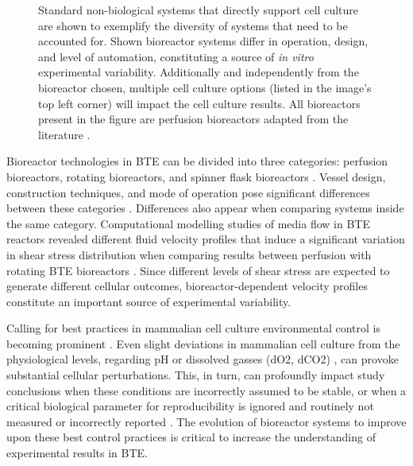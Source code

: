 \begin{figure}
\caption{Standard non-biological systems that directly support cell culture are shown to exemplify the diversity of systems that need to be accounted for. Shown bioreactor systems differ in operation, design, and level of automation, constituting a source of \textit{in vitro} experimental variability. Additionally and independently from the bioreactor chosen, multiple cell culture options (listed in the image's top left corner) will impact the cell culture results. All bioreactors present in the figure are perfusion bioreactors adapted from the literature \cite{Lim2019-gx, Birru2018-rj, Gabetti2022-hp}.}
\label{fig1d2}
\end{figure}

Bioreactor technologies in \ac{BTE} can be divided into three categories: perfusion bioreactors, rotating bioreactors, and spinner flask bioreactors \cite{Kazimierczak2022-mq}. Vessel design, construction techniques, and mode of operation pose significant differences between these categories \cite{Melo-Fonseca2023-fd}. Differences also appear when comparing systems inside the same category. Computational modelling studies of media flow in \ac{BTE} reactors revealed different fluid velocity profiles that induce a significant variation in shear stress distribution when comparing results between perfusion with rotating \ac{BTE} bioreactors \cite{Nokhbatolfoghahaei2020-yt}. Since different levels of shear stress are expected to generate different cellular outcomes, bioreactor-dependent velocity profiles constitute an important source of experimental variability. 

Calling for best practices in mammalian cell culture environmental control is becoming prominent \cite{Klein2021-dz, Klein2022-yj}.  Even slight deviations in mammalian cell culture from the physiological levels, regarding \acs{pH} \cite{Michl2019-js} or dissolved gasses (\acs{dO2}, \acs{dCO2}) \cite{Ast2019-mc, Place2017-bn}, can provoke substantial cellular perturbations. This, in turn, can profoundly impact study conclusions when these conditions are incorrectly assumed to be stable, or when a critical biological parameter for reproducibility is ignored and routinely not measured or incorrectly reported \cite{Al-Ani2018-df}. The evolution of bioreactor systems to improve upon these best control practices is critical to increase the understanding of experimental results in \ac{BTE}.

